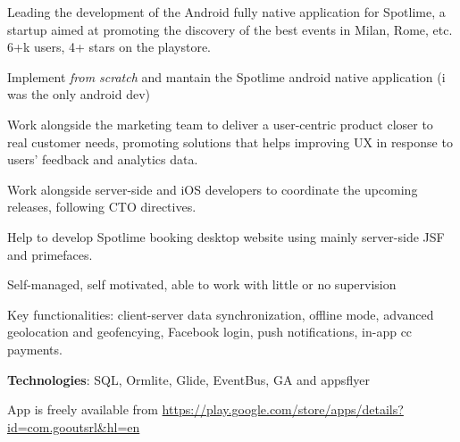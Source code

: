 \begin{cventries}
{\begin{cvitems}
	\item Leading the 
   development of the 
   Android fully native application for 
   Spotlime, a startup aimed  at promoting  the 
   discovery of the best events in Milan, Rome, etc. 6+k users,  4+ stars on the playstore. 
      \item Implement \emph{from scratch} and mantain the Spotlime android
	      native application (i was the only android dev)
      \item 
   Work alongside the marketing team to deliver a user-centric product closer
   to real customer 
   needs, promoting solutions that helps improving UX in response
   to users' feedback and analytics data.
      \item 
   Work alongside server-side and iOS developers to coordinate the upcoming
   releases, following CTO directives.
\item Help to develop Spotlime booking desktop website using mainly server-side JSF and
   primefaces.
      \item Self-managed, self motivated, able to work with little or no supervision
\item Key functionalities: 
	client-server data synchronization, offline mode, 
   advanced geolocation and geofencying, Facebook login, push notifications, in-app cc payments.
\item \textbf{Technologies}: SQL, Ormlite, Glide, EventBus, GA and appsflyer
   \item App is freely available from 
   \url{https://play.google.com/store/apps/details?id=com.gooutsrl&hl=en}
	\end{cvitems}
}


\end{cventries}
